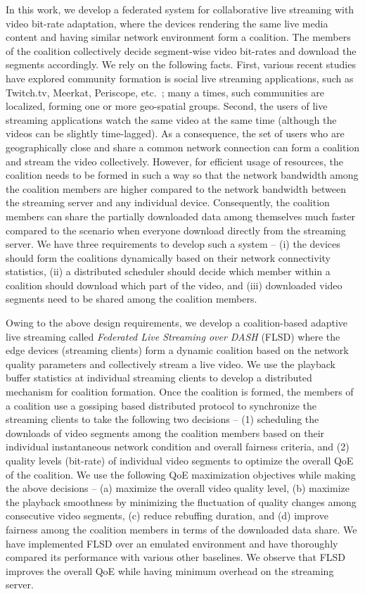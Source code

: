 In this work, we develop a federated system for collaborative live streaming with video bit-rate adaptation, where the devices rendering the same live media content and having similar network environment form a coalition. The members of the coalition collectively decide segment-wise video bit-rates and download the segments accordingly. We rely on the following facts. First, various recent studies have explored community formation is social live streaming applications, such as Twitch.tv, Meerkat, Periscope, etc.~\cite{dougherty2011live}; many a times, such communities are localized, forming one or more geo-spatial groups. Second, the users of live streaming applications watch the same video at the same time (although the videos can be slightly time-lagged). As a consequence, the set of users who are geographically close and share a common network connection can form a coalition and stream the video collectively. However, for efficient usage of resources, the coalition needs to be formed in such a way so that the network bandwidth among the coalition members are higher compared to the network bandwidth between the streaming server and any individual device. Consequently, the coalition members can share the partially downloaded data among themselves much faster compared to the scenario when everyone download directly from the streaming server. We have three requirements to develop such a system -- (i) the devices should form the coalitions dynamically based on their network connectivity statistics, (ii) a distributed scheduler should decide which member within a coalition should download which part of the video, and (iii) downloaded video segments need to be shared among the coalition members. 

Owing to the above design requirements, we develop a coalition-based adaptive live streaming  called \textit{Federated Live Streaming over DASH} (FLSD) where the edge devices (streaming clients) form a dynamic coalition based on the network quality parameters and collectively stream a live video. We use the playback buffer statistics at individual streaming clients to develop a distributed mechanism for coalition formation. Once the coalition is formed, the members of a coalition use a gossiping based distributed protocol to synchronize the streaming clients to take the following two decisions -- (1) scheduling the downloads of video segments among the coalition members based on their individual instantaneous network condition and overall fairness criteria, and (2) quality levels (bit-rate) of individual video segments to optimize the overall QoE of the coalition. We use the following QoE maximization objectives while making the above decisions -- (a) maximize the overall video quality level, (b) maximize the playback smoothness by minimizing the fluctuation of quality changes among consecutive video segments, (c) reduce rebuffing duration, and (d) improve fairness  among the coalition members in terms of the downloaded data share. We have implemented FLSD over an emulated environment and have thoroughly compared its performance with various other baselines. We observe that FLSD improves the overall QoE while having minimum overhead on the streaming server. 


